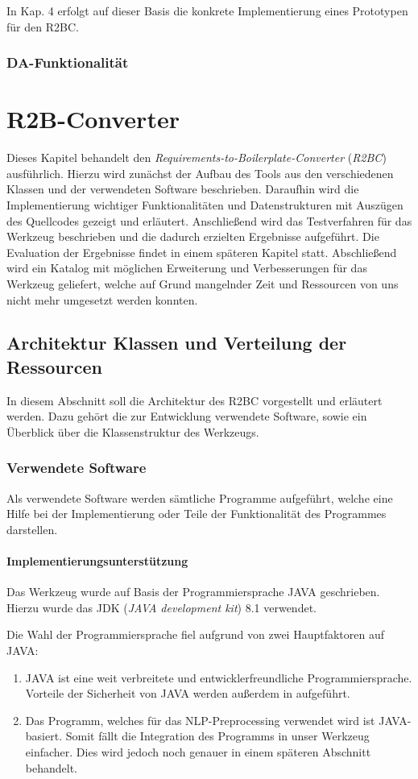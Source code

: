 \documentclass[12pt]{report}
\begin{document}
In Kap. 4 erfolgt auf dieser Basis die konkrete Implementierung eines Prototypen für den R2BC.
\subsection{DA-Funktionalität}
\chapter{R2B-Converter}
Dieses Kapitel behandelt den \textit{Requirements-to-Boilerplate-Converter} (\textit{R2BC}) ausführlich. Hierzu wird zunächst der Aufbau des Tools aus den verschiedenen Klassen und der verwendeten Software beschrieben. Daraufhin wird die Implementierung wichtiger Funktionalitäten und Datenstrukturen mit Auszügen des Quellcodes gezeigt und erläutert. Anschließend wird das Testverfahren für das Werkzeug beschrieben und die dadurch erzielten Ergebnisse aufgeführt. Die Evaluation der Ergebnisse findet in einem späteren Kapitel statt. Abschließend wird ein Katalog mit möglichen Erweiterung und Verbesserungen für das Werkzeug geliefert, welche auf Grund mangelnder Zeit und Ressourcen von uns nicht mehr umgesetzt werden konnten. 

\section{Architektur Klassen und Verteilung der Ressourcen}
In diesem Abschnitt soll die Architektur des R2BC vorgestellt und erläutert werden. Dazu gehört die zur Entwicklung verwendete Software, sowie ein Überblick über die Klassenstruktur des Werkzeugs. 

\subsection{Verwendete Software}
Als verwendete Software werden sämtliche Programme aufgeführt, welche eine Hilfe bei der Implementierung oder Teile der Funktionalität des Programmes darstellen. 

\subsubsection{Implementierungsunterstützung}
Das Werkzeug wurde auf Basis der Programmiersprache JAVA geschrieben. Hierzu wurde das JDK (\textit{JAVA development kit}) 8.1 verwendet. 

Die Wahl der Programmiersprache fiel aufgrund von zwei Hauptfaktoren auf JAVA: 
\begin{enumerate}
\item JAVA ist eine weit verbreitete und entwicklerfreundliche Programmiersprache. Vorteile der Sicherheit von JAVA werden außerdem in \cite{rs18} aufgeführt.
\item Das Programm, welches für das NLP-Preprocessing verwendet wird ist JAVA-basiert. Somit fällt die Integration des Programms in unser Werkzeug einfacher. Dies wird jedoch noch genauer in einem späteren Abschnitt behandelt.
\end{enumerate}
\end{document}
